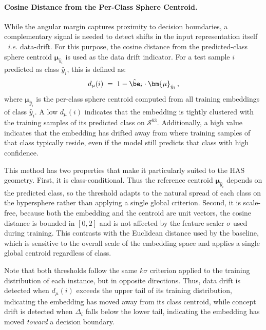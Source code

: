 \paragraph{Cosine Distance from the Per-Class Sphere Centroid.}

While the angular margin captures proximity to decision boundaries,
a complementary signal is needed to detect shifts in the input
representation itself ~\textit{i.e.} data-drift.
For this purpose, the cosine distance from the
predicted-class sphere centroid $\bm{\mu}_{\hat{y}_i}$ is used
as the data drift indicator. For a test sample $i$ predicted as
class $\hat{y}_i$, this is defined as:
\begin{equation}
  d_{\mu}(i) \;=\; 1 - \hat{\be}_i \cdot \bm{\mu}_{\hat{y}_i}\,,
  \label{eq:cos_dist}
\end{equation}
where $\bm{\mu}_{\hat{y}_i}$ is the per-class sphere centroid
computed from all training embeddings of class $\hat{y}_i$.
A low $d_\mu(i)$ indicates that the embedding is tightly
clustered with the training samples of its predicted class on
$\mathcal{S}^{63}$.
Additionally, a high value indicates that the embedding
has drifted away from where training samples of that class
typically reside, even if the model still predicts that class
with high confidence.

This method has two properties that make it particularly suited
to the HAS geometry. First, it is class-conditional.
Thus the reference centroid $\bm{\mu}_{\hat{y}_i}$ depends on the
predicted class, so the threshold adapts to the natural spread
of each class on the hypersphere rather than applying a single
global criterion. Second, it is scale-free, because both
the embedding and the centroid are unit vectors, the cosine
distance is bounded in $[0, 2]$ and is not affected by the
feature scaler $\sigma$ used during training. This contrasts
with the Euclidean distance used by the baseline, which is
sensitive to the overall scale of the embedding space and
applies a single global centroid regardless of class.

Note that both thresholds follow the same $k\sigma$ criterion applied to
the training distribution of each instance, but in opposite
directions. 
Thus, data drift is detected when $d_\mu(i)$ exceeds the
upper tail of its training distribution, indicating the embedding
has moved away from its class centroid, while concept drift is
detected when $\Delta_i$ falls below the lower tail, indicating
the embedding has moved \emph{toward} a decision boundary.

